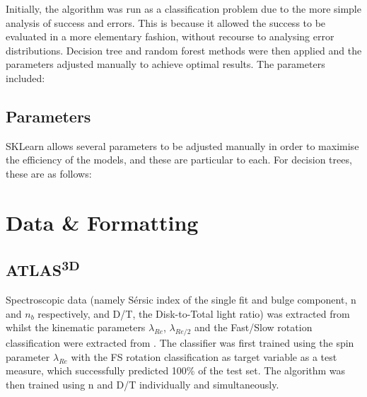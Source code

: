 Initially, the algorithm was run as a classification problem due to the more simple analysis of success and errors. This is because it allowed the success to be evaluated in a more elementary fashion, without recourse to analysing error distributions.
Decision tree and random forest methods were then applied and the parameters adjusted manually to achieve optimal results. The parameters included:
\subsection{Parameters}
SKLearn allows several parameters to be adjusted manually in order to maximise the efficiency of the models, and these are particular to each. For decision trees, these are as follows:
\section{Data \& Formatting}
\subsection{ATLAS\textsuperscript{3D}}
Spectroscopic data (namely S\'ersic index of the single fit and bulge component, n and $n_{b}$ respectively,  and D/T, the Disk-to-Total light ratio) was extracted from \cite{Krajnovic2013} whilst the kinematic parameters $\lambda_{Re}$, $\lambda_{Re/2}$ and the Fast/Slow rotation classification were extracted from \cite{Emsellem2011}.
The classifier was first trained using the spin parameter $\lambda_{Re}$ with the FS rotation classification as target variable as a test measure, which successfully predicted 100\% of the test set. 
The algorithm was then trained using n and D/T individually and simultaneously.

